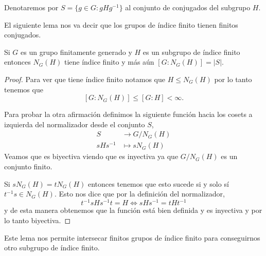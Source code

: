\documentclass[tesis.tex]{subfiles}
\begin{document}
Denotaremos por $S= \{ g \in G :  gHg^{-1} \}$ al conjunto de conjugados del subgrupo $H$. 

El siguiente lema nos va decir que los grupos de índice finito tienen finitos conjugados.

\begin{lema}\label{lema_normalizador_conjugados}
	Si $G$ es un grupo finitamente generado y $H$ es un subgrupo de índice finito entonces $N_G(H)$ tiene índice finito y más aún $[G:N_G(H)] = |S|$.
\end{lema}
\begin{proof}
	Para ver que tiene índice finito notamos que $H \le N_G(H)$ por lo tanto tenemos que 
	\[
	[G:N_G(H)] \le [G:H] < \infty.
	\]
	
	Para probar la otra afirmación definimos la siguiente función hacia los cosets a izquierda del normalizador desde el conjunto $S$,
	\begin{align*}
		S  &\to  G/N_G(H)  \\
		sHs^{-1} &\mapsto sN_G(H)
	\end{align*}
	Veamos que es biyectiva viendo que es inyectiva ya que $G/N_{G}(H)$ es un conjunto finito.
	
	Si $sN_G(H) = tN_G(H)$ entonces tenemos que esto sucede si y solo sí $t^{-1}s \in N_G(H)$.
	Esto nos dice que por la definición del normalizador,
	\[
	t^{-1}s H s^{-1}t = H \iff sHs^{-1} = tHt^{-1}
	\]
	y de esta manera obtenemos que la función está bien definida y es inyectiva y por lo tanto biyectiva.
	
\end{proof}

Este lema nos permite intersecar finitos grupos de índice finito para conseguirnos otro subgrupo de índice finito. 
\end{document}

